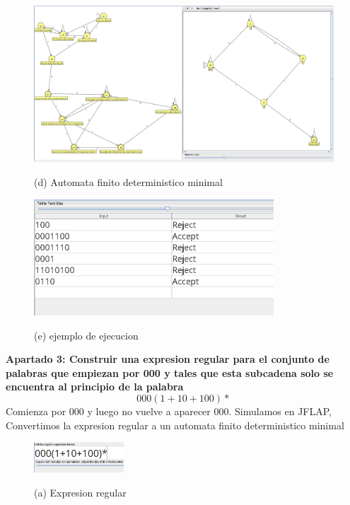 \documentclass{article}
\begin{document}
        \begin{figure}[!h]
            \centering
            \includegraphics[width=1.2\textwidth]{./Imagenes/image28.png}
            \label{fig:label4}
            \caption*{(d) Automata finito deterministico minimal}
        \end{figure}

        \newpage
        \begin{figure}[!h]
            \centering
            \includegraphics[width=0.8\textwidth]{./Imagenes/image29.png}
            \label{fig:label4}
            \caption*{(e) ejemplo de ejecucion}
        \end{figure}

        \textbf{Apartado 3: Construir una expresion regular para el conjunto de palabras que empiezan por 000 y tales que esta subcadena solo se encuentra al principio de la palabra}
        $$ 000(1+10+100)*$$
        Comienza por 000 y luego no vuelve a aparecer 000. Simulamos en JFLAP, Convertimos la expresion regular a un automata finito deterministico minimal

        \begin{figure}[!h]
            \centering
            \includegraphics[width=0.3\textwidth]{./Imagenes/image20.png}
            \label{fig:label4}
            \caption*{(a) Expresion regular}
        \end{figure}
\end{document}
